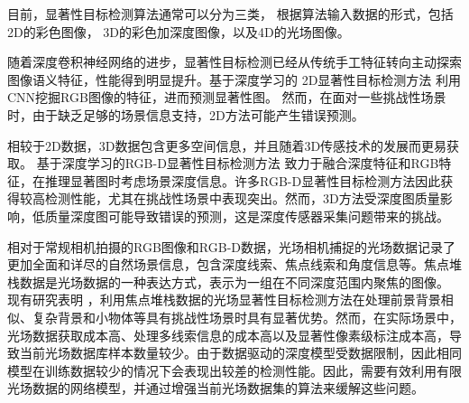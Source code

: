 



目前，显著性目标检测算法通常可以分为三类，
根据算法输入数据的形式，包括2D的彩色图像，
3D的彩色加深度图像，以及4D的光场图像。


\todo 

随着深度卷积神经网络的进步，显著性目标检测已经从传统手工特征转向主动探索图像语义特征，性能得到明显提升。基于深度学习的
2D显著性目标检测方法
利用CNN挖掘RGB图像的特征，进而预测显著性图。
然而，在面对一些挑战性场景时，由于缺乏足够的场景信息支持，2D方法可能产生错误预测。


相较于2D数据，3D数据包含更多空间信息，并且随着3D传感技术的发展而更易获取。
基于深度学习的RGB-D显著性目标检测方法
致力于融合深度特征和RGB特征，在推理显著图时考虑场景深度信息。许多RGB-D显著性目标检测方法因此获得较高检测性能，尤其在挑战性场景中表现突出。然而，3D方法受深度图质量影响，低质量深度图可能导致错误的预测，这是深度传感器采集问题带来的挑战。


相对于常规相机拍摄的RGB图像和RGB-D数据，光场相机捕捉的光场数据记录了更加全面和详尽的自然场景信息，包含深度线索、焦点线索和角度信息等。焦点堆栈数据是光场数据的一种表达方式，表示为一组在不同深度范围内聚焦的图像。
现有研究表明
，利用焦点堆栈数据的光场显著性目标检测方法在处理前景背景相似、复杂背景和小物体等具有挑战性场景时具有显著优势。然而，在实际场景中，光场数据获取成本高、处理多线索信息的成本高以及显著性像素级标注成本高，导致当前光场数据库样本数量较少。由于数据驱动的深度模型受数据限制，因此相同模型在训练数据较少的情况下会表现出较差的检测性能。因此，需要有效利用有限光场数据的网络模型，并通过增强当前光场数据集的算法来缓解这些问题。


